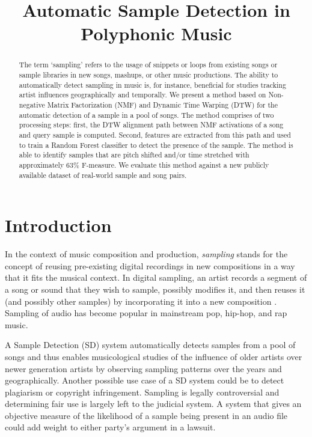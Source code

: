 \documentclass{article}
\title{Automatic Sample Detection in Polyphonic Music}
\begin{document}
%
\maketitle
%
\begin{abstract}
The term `sampling' refers to the usage of snippets or loops from existing songs or sample libraries in new songs, mashups, or other music productions. The ability to automatically detect sampling in music is, for instance, beneficial for studies tracking artist influences geographically and temporally. We present a method based on Non-negative Matrix Factorization (NMF) and Dynamic Time Warping (DTW) for the automatic detection of a sample in a pool of songs. The method comprises of two processing steps: first, the DTW alignment path between NMF activations of a song and query sample is computed. Second, features are extracted from this path and used to train a Random Forest classifier to detect the presence of the sample. The method is able to identify samples that are pitch shifted and/or time stretched with approximately 63\% F-measure. We evaluate this method against a new publicly available dataset of real-world sample and song pairs.
\end{abstract}
%
\section{Introduction}
\label{sec:intro}

In the context of music composition and production, \textit{sampling} stands for the concept of reusing pre-existing digital recordings in new compositions in a way that it fits the musical context. In digital sampling, an artist records a segment of a song or sound that they wish to sample, possibly modifies it, and then reuses it (and possibly other samples) by incorporating it into a new composition \cite{katz_capturing_2004}. Sampling of audio has become popular in mainstream pop, hip-hop, and rap music. 

A Sample Detection (SD) system automatically detects samples from a pool of songs and thus enables musicological studies of the influence of older artists over newer generation artists by observing sampling patterns over the years and geographically.
%
Another possible use case of a SD system could be to detect plagiarism or copyright infringement. Sampling is legally controversial and determining fair use is largely left to the judicial system. A system that gives an objective measure of the likelihood of a sample being present in an audio file could add weight to either party's argument in a lawsuit.
\end{document}
